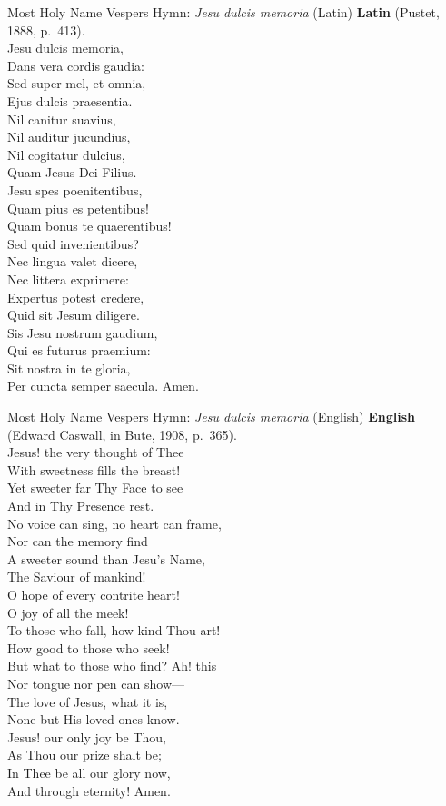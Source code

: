 \begin{massbox}{Most Holy Name Vespers Hymn: \textit{Jesu dulcis memoria} (Latin)}
\textbf{Latin} (Pustet, 1888, p.~413).\\
Jesu dulcis memoria,\\
Dans vera cordis gaudia:\\
Sed super mel, et omnia,\\
Ejus dulcis praesentia.\\[0.4em]
Nil canitur suavius,\\
Nil auditur jucundius,\\
Nil cogitatur dulcius,\\
Quam Jesus Dei Filius.\\[0.4em]
Jesu spes poenitentibus,\\
Quam pius es petentibus!\\
Quam bonus te quaerentibus!\\
Sed quid invenientibus?\\[0.4em]
Nec lingua valet dicere,\\
Nec littera exprimere:\\
Expertus potest credere,\\
Quid sit Jesum diligere.\\[0.4em]
Sis Jesu nostrum gaudium,\\
Qui es futurus praemium:\\
Sit nostra in te gloria,\\
Per cuncta semper saecula. Amen.
\end{massbox}

\begin{massbox}{Most Holy Name Vespers Hymn: \textit{Jesu dulcis memoria} (English)}
\textbf{English} (Edward Caswall, in Bute, 1908, p.~365).\\
Jesus! the very thought of Thee\\
With sweetness fills the breast!\\
Yet sweeter far Thy Face to see\\
And in Thy Presence rest.\\[0.4em]
No voice can sing, no heart can frame,\\
Nor can the memory find\\
A sweeter sound than Jesu's Name,\\
The Saviour of mankind!\\[0.4em]
O hope of every contrite heart!\\
O joy of all the meek!\\
To those who fall, how kind Thou art!\\
How good to those who seek!\\[0.4em]
But what to those who find? Ah! this\\
Nor tongue nor pen can show---\\
The love of Jesus, what it is,\\
None but His loved-ones know.\\[0.4em]
Jesus! our only joy be Thou,\\
As Thou our prize shalt be;\\
In Thee be all our glory now,\\
And through eternity! Amen.
\end{massbox}

